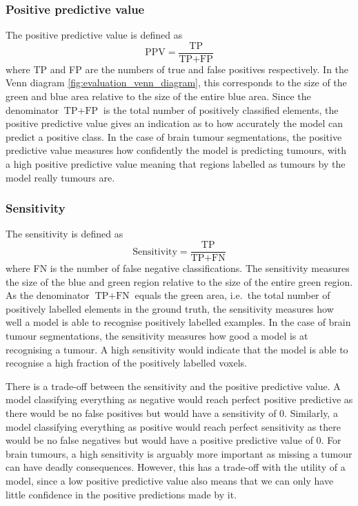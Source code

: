\documentclass[12pt,a4paper,twoside,openright]{report}
\begin{document}
\subsubsection{Positive predictive value}
The positive predictive value is defined as
\begin{equation}
	\textrm{PPV} = \frac{\textrm{TP}}{\textrm{TP} + \textrm{FP}}
\end{equation}
where \textrm{TP} and \textrm{FP} are the numbers of true and false positives respectively. In the Venn diagram \ref{fig:evaluation_venn_diagram}, this corresponds to the size of the green and blue area relative to the size of the entire blue area.  Since the denominator $\textrm{TP} + \textrm{FP}$ is the total number of positively classified elements, the positive predictive value gives an indication as to how accurately the model can predict a positive class. In the case of brain tumour segmentations, the positive predictive value measures how confidently the model is predicting tumours, with a high positive predictive value meaning that regions labelled as tumours by the model really tumours are.
\subsubsection{Sensitivity}
The sensitivity is defined as 
\begin{equation}
	\textrm{Sensitivity} = \frac{\textrm{TP}}{\textrm{TP} + \textrm{FN}}
\end{equation}
where \textrm{FN} is the number of false negative classifications. The sensitivity measures the size of the blue and green region relative to the size of the entire green region. As the denominator $\textrm{TP} + \textrm{FN}$ equals the green area, i.e.\ the total number of positively labelled elements in the ground truth, the sensitivity measures how well a model is able to recognise positively labelled examples. In the case of brain tumour segmentations, the sensitivity measures how good a model is at recognising a tumour. A high sensitivity would indicate that the model is able to recognise a high fraction of the positively labelled voxels.

There is a trade-off between the sensitivity and the positive predictive value. A model classifying everything as negative would reach perfect positive predictive as there would be no false positives but would have a sensitivity of 0. Similarly, a model classifying everything as positive would reach perfect sensitivity as there would be no false negatives but would have a positive predictive value of 0. For brain tumours, a high sensitivity is arguably more important as missing a tumour can have deadly consequences. However, this has a trade-off with the utility of a model, since a low positive predictive value also means that we can only have little confidence in the positive predictions made by it.
\end{document}
